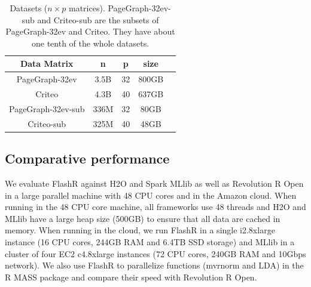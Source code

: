 \begin{table}
\begin{center}
\caption{Datasets ($n \times p$ matrices). PageGraph-32ev-sub and
	Criteo-sub are the subsets of PageGraph-32ev and Criteo. They
	have about one tenth of the whole datasets.}
\vspace{-10pt}
\footnotesize
\begin{tabular}{|c|c|c|c|c|}
\hline
Data Matrix & n & p & size \\
\hline
PageGraph-32ev \cite{webgraph} & 3.5B & 32 & 800GB \\
\hline
Criteo \cite{criteo} & 4.3B & 40 & 637GB \\
\hline
PageGraph-32ev-sub \cite{webgraph} & 336M & 32 & 80GB \\
\hline
Criteo-sub \cite{criteo} & 325M & 40 & 48GB \\
\hline
\end{tabular}
\normalsize
\label{tbl:data}
\end{center}
\end{table}

\subsection{Comparative performance}
We evaluate FlashR against H2O \cite{h2o} and Spark MLlib \cite{mllib} as well
as Revolution R Open \cite{rro} in a large parallel machine with 48 CPU cores
and in the Amazon cloud. When running in the 48 CPU core machine, all frameworks
use 48 threads and H2O and MLlib have a large heap size (500GB) to ensure that
all data are cached in memory. When running in the cloud, we run FlashR
in a single i2.8xlarge instance (16 CPU cores, 244GB RAM and 6.4TB SSD storage)
and MLlib in a cluster of four EC2 c4.8xlarge instances (72 CPU cores, 240GB RAM
and 10Gbps network). We also use FlashR to parallelize functions (mvrnorm and LDA)
in the R MASS package and compare their speed with Revolution R Open.

